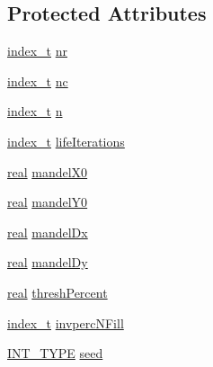 \subsection*{Protected Attributes}
\begin{CompactItemize}
\item 
\hyperlink{cowichan_8hpp_5b04577d5d21124855deaad298595371}{index\_\-t} \hyperlink{class_cowichan_44f139040042cc616e542be6faa28672}{nr}
\item 
\hyperlink{cowichan_8hpp_5b04577d5d21124855deaad298595371}{index\_\-t} \hyperlink{class_cowichan_81d2fc0da7b4ef388a1dbf08ac820eb1}{nc}
\item 
\hyperlink{cowichan_8hpp_5b04577d5d21124855deaad298595371}{index\_\-t} \hyperlink{class_cowichan_10e0c7c7bcccf11869821fa03cb7a6ee}{n}
\item 
\hyperlink{cowichan_8hpp_5b04577d5d21124855deaad298595371}{index\_\-t} \hyperlink{class_cowichan_edeb55a8b961f270ec35869dbba3afde}{lifeIterations}
\item 
\hyperlink{cowichan_8hpp_4d521b2c54a1f6312cc8fa04827eaf98}{real} \hyperlink{class_cowichan_f0bab1165abe53fea17e65764d247786}{mandelX0}
\item 
\hyperlink{cowichan_8hpp_4d521b2c54a1f6312cc8fa04827eaf98}{real} \hyperlink{class_cowichan_7b5e0e4e2026c78a6ec45fe306e5af93}{mandelY0}
\item 
\hyperlink{cowichan_8hpp_4d521b2c54a1f6312cc8fa04827eaf98}{real} \hyperlink{class_cowichan_edde2560c73a48dd44ea52c6a42c8649}{mandelDx}
\item 
\hyperlink{cowichan_8hpp_4d521b2c54a1f6312cc8fa04827eaf98}{real} \hyperlink{class_cowichan_7189d7127e740a2e6b14dcf0e757a500}{mandelDy}
\item 
\hyperlink{cowichan_8hpp_4d521b2c54a1f6312cc8fa04827eaf98}{real} \hyperlink{class_cowichan_a42c0ae639cc3ac124a013bc3e3162ad}{threshPercent}
\item 
\hyperlink{cowichan_8hpp_5b04577d5d21124855deaad298595371}{index\_\-t} \hyperlink{class_cowichan_c637b7380ab889ed42652790a3c542c6}{invpercNFill}
\item 
\hyperlink{cowichan_8hpp_c96945095fd0ce7186a1d00a89f77d2c}{INT\_\-TYPE} \hyperlink{class_cowichan_e9f8e9769f15e2648435064d4286b1a6}{seed}
\end{CompactItemize}
